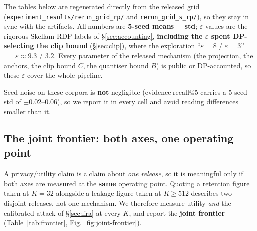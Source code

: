 \documentclass[pdflatex,sn-mathphys-num,12pt]{sn-jnl}
\theoremstyle{thmstyleone}%
\theoremstyle{thmstyletwo}%
\theoremstyle{thmstylethree}%
\newcommand{\eps}{\varepsilon}
\newcommand{\secref}[1]{\S\ref{#1}}
\begin{document}
The tables below are regenerated directly from the released grid
(\texttt{experiment\_results/rerun\_grid\_rp/} and \texttt{rerun\_grid\_s\_rp/}), so they
stay in sync with the artifacts. All numbers are \textbf{5-seed means $\pm$ std};
$\eps$ values are the rigorous Skellam-RDP labels of \secref{sec:accounting},
\textbf{including the $\eps$ spent DP-selecting the clip bound} (\secref{sec:clip}), where
the exploration ``$\eps = 8$ / $\eps = 3$'' $=$ $\eps \approx 9.3$ / $3.2$. Every
parameter of the released mechanism (the projection, the anchors, the clip bound $C$,
the quantiser bound $B$) is public or DP-accounted, so these $\eps$ cover the whole
pipeline.

Seed noise on these corpora is \textbf{not} negligible (evidence-recall@5 carries a
5-seed std of $\pm 0.02$--$0.06$), so we report it in every cell and avoid reading
differences smaller than it.

\subsection{The joint frontier: both axes, one operating point}\label{sec:frontier}

A privacy/utility claim is a claim about \emph{one release}, so it is meaningful only
if both axes are measured at the \textbf{same} operating point. Quoting a retention
figure taken at $K = 32$ alongside a leakage figure taken at $K \geq 512$ describes two
disjoint releases, not one mechanism. We therefore measure utility \emph{and} the
calibrated attack of \secref{sec:lira} at every $K$, and report the \textbf{joint
frontier} (Table~\ref{tab:frontier}, Fig.~\ref{fig:joint-frontier}).
\end{document}
